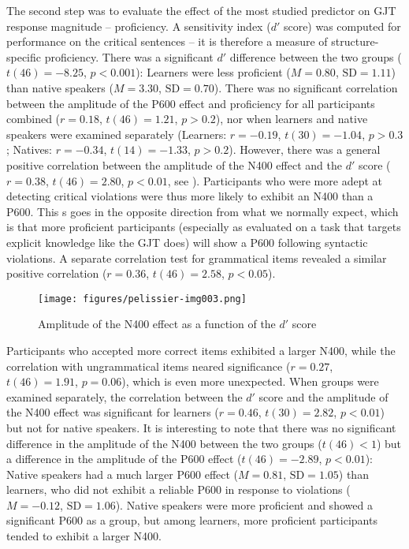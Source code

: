 \documentclass[output=paper,colorlinks,citecolor=brown,modfonts,nonflat]{../langscibook}
\begin{document}
The second step was to evaluate the effect of the most studied predictor on GJT response magnitude – proficiency. A sensitivity index ($d′$ score) was computed for performance on the critical sentences – it is therefore a measure of structure-specific proficiency. There was a significant $d′$ difference between the two groups ($t(46) = -8.25$, $p < 0.001$): Learners were less proficient ($M = 0.80$, $\text{SD} = 1.11$) than native speakers ($M = 3.30$, $\text{SD} = 0.70$). There was no significant correlation between the amplitude of the P600 effect and proficiency for all participants combined ($r = 0.18$, $t(46) = 1.21$, $p > 0.2$), nor when learners and native speakers were examined separately (Learners: $r = -0.19$, $t(30) = -1.04$, $p > 0.3$; Natives: $r = -0.34$, $t(14) = -1.33$, $p > 0.2$). However, there was a general positive correlation between the amplitude of the N400 effect and the $d′$ score ($r = 0.38$, $t(46) = 2.80$, $p <  0.01$, see ). Participants who were more adept at detecting critical violations were thus more likely to exhibit an N400 than a P600. This s goes in the opposite direction from what we normally expect, which is that more proficient participants (especially as evaluated on a task that targets explicit knowledge like the GJT does) will show a P600 following syntactic violations. A separate correlation test for grammatical items revealed a similar positive correlation ($r = 0.36$, $t(46) = 2.58$, $p <  0.05$). 

 
\begin{figure}
\texttt{[image: figures/pelissier-img003.png]}
\caption{Amplitude of the N400 effect as a function of the $d′$ score\label{fig:pelissier:3}}
\end{figure}

Participants who accepted more correct items exhibited a larger N400, while the correlation with ungrammatical items neared significance ($r = 0.27$, $t(46) = 1.91$, $p = 0.06$), which is even more unexpected.  When groups were examined separately, the correlation between the $d′$ score and the amplitude of the N400 effect was significant for learners ($r = 0.46$, $t(30) = 2.82$, $p < 0.01$) but not for native speakers. It is interesting to note that there was no significant difference in the amplitude of the N400 between the two groups ($t(46) < 1$) but a difference in the amplitude of the P600 effect ($t(46) = -2.89$, $p < 0.01$): Native speakers had a much larger P600 effect ($M = 0.81$, $\text{SD} = 1.05$) than learners, who did not exhibit a reliable P600 in response to violations ($M = -0.12$, $\text{SD} = 1.06$).  Native speakers were more proficient and showed a significant P600 as a group, but among learners, more proficient participants tended to exhibit a larger N400. 
\end{document}

